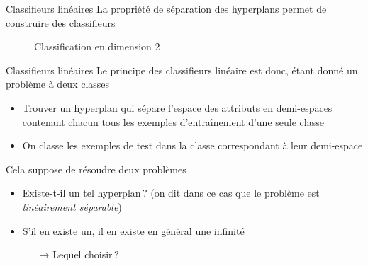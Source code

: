 \documentclass[../allslides.tex]{subfiles}
\begin{document}
\begin{frame}{Classifieurs linéaires}
	La propriété de séparation des hyperplans permet de construire des classifieurs
	\begin{figure}
	    \tikzset{external/export=true}
	    \caption{Classification  en dimension $2$}
	\end{figure}
\end{frame}
\begin{frame}{Classifieurs linéaires}
    Le principe des classifieurs linéaire est donc, étant donné un problème à deux classes
    \begin{itemize}
        \item Trouver un hyperplan qui sépare l'espace des attributs en demi-espaces contenant chacun tous les exemples d'entraînement d'une seule classe
        \item On classe les exemples de test dans la classe correspondant à leur demi-espace
    \end{itemize}

    Cela suppose de résoudre deux problèmes
    \begin{itemize}
        \item Existe-t-il un tel hyperplan ? (on dit dans ce cas que le problème est \emph{linéairement séparable})
        \item S'il en existe un, il en existe en général une infinité
            \begin{itemize}
                \item[→] Lequel choisir ?
            \end{itemize}
    \end{itemize}
\end{frame}
\end{document}
